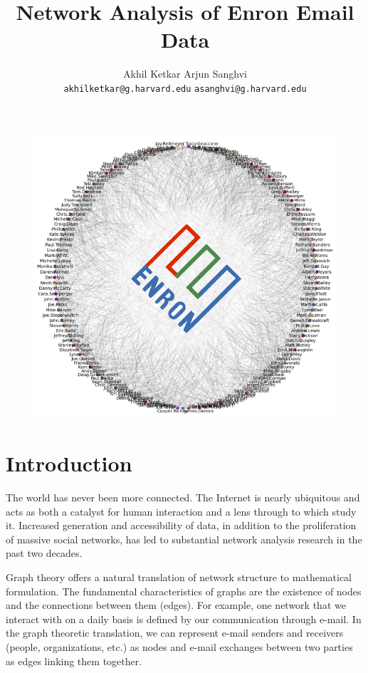 \documentclass[12pt]{article}
\author{Akhil Ketkar \hspace{4.1cm} Arjun Sanghvi \\
	\texttt{akhilketkar@g.harvard.edu} \hspace{1cm} \texttt{asanghvi@g.harvard.edu}}
\title{Network Analysis of Enron Email Data}
\begin{document}
\begin{figure}
\centering
\includegraphics[width=15cm]{EnronNetwork}
\end{figure}

\maketitle


\clearpage

\section{Introduction}
	The world has never been more connected. The Internet is nearly ubiquitous and acts as both a catalyst for human interaction and a lens through to which study it. Increased generation and accessibility of data, in addition to the proliferation of massive social networks, has led to substantial network analysis research in the past two decades.
	
	Graph theory offers a natural translation of network structure to mathematical formulation. The fundamental characteristics of graphs are the existence of nodes and the connections between them (edges). For example, one network that we interact with on a daily basis is defined by our communication through e-mail. In the graph theoretic translation, we can represent e-mail senders and receivers (people, organizations, etc.) as nodes and e-mail exchanges between two parties as edges linking them together.
	
\end{document}
